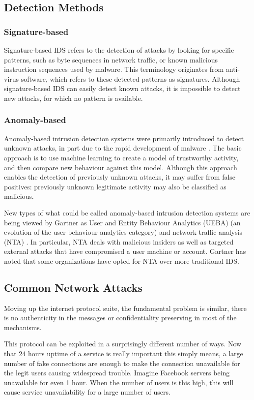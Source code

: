 \documentclass[12pt]{article}
\theoremstyle{definition}
\begin{document}
		\subsection{Detection Methods}
			\subsubsection{Signature-based}
			Signature-based IDS refers to the detection of attacks by looking for specific patterns, such as byte sequences in network traffic, or known malicious instruction sequences used by malware. This terminology originates from anti-virus software, which refers to these detected patterns as signatures. Although signature-based IDS can easily detect known attacks, it is impossible to detect new attacks, for which no pattern is available.
			\subsubsection{Anomaly-based}
			Anomaly-based intrusion detection systems were primarily introduced to detect unknown attacks, in part due to the rapid development of malware \cite{Saeed2016}. The basic approach is to use machine learning to create a model of trustworthy activity, and then compare new behaviour against this model. Although this approach enables the detection of previously unknown attacks, it may suffer from false positives: previously unknown legitimate activity may also be classified as malicious.
			
			New types of what could be called anomaly-based intrusion detection systems are being viewed by Gartner as User and Entity Behaviour Analytics (UEBA) (an evolution of the user behaviour analytics category) and network traffic analysis (NTA) \cite{Wang2010}. In particular, NTA deals with malicious insiders as well as targeted external attacks that have compromised a user machine or account. Gartner has noted that some organizations have opted for NTA over more traditional IDS.
		\subsection{Common Network Attacks}
			Moving up the internet protocol suite, the fundamental problem is similar, there is no authenticity in the messages or confidentiality preserving in most of the mechanisms.
			
			This protocol can be exploited in a surprisingly different number of ways. Now that 24 hours uptime of a service is really important this simply means, a large number of fake connections are enough to make the connection unavailable for the legit users causing widespread trouble. Imagine Facebook servers being unavailable for even 1 hour. When the number of users is this high, this will cause service unavailability for a large number of users. 
			
\end{document}
